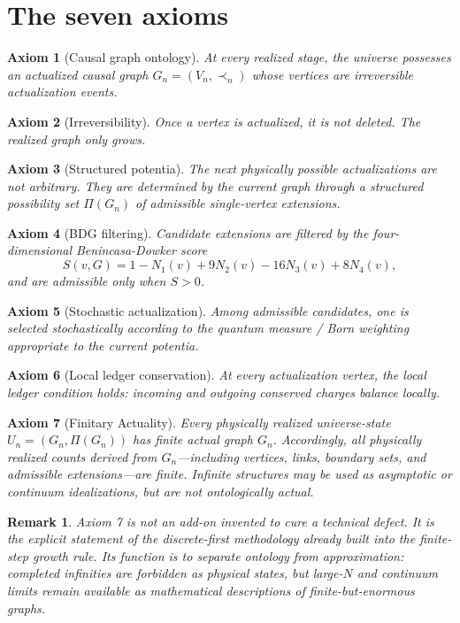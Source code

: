 \documentclass[11pt]{article}
\newtheorem{axiom}{Axiom}
\newtheorem{remark}{Remark}
\newcommand{\Pot}{\Pi}
\begin{document}
\section{The seven axioms}
\begin{axiom}[Causal graph ontology]
At every realized stage, the universe possesses an actualized causal graph $G_n=(V_n,\prec_n)$ whose vertices are irreversible actualization events.
\end{axiom}

\begin{axiom}[Irreversibility]
Once a vertex is actualized, it is not deleted. The realized graph only grows.
\end{axiom}

\begin{axiom}[Structured potentia]
The next physically possible actualizations are not arbitrary. They are determined by the current graph through a structured possibility set $\Pot(G_n)$ of admissible single-vertex extensions.
\end{axiom}

\begin{axiom}[BDG filtering]
Candidate extensions are filtered by the four-dimensional Benincasa-Dowker score
\[
S(v,G)=1-N_1(v)+9N_2(v)-16N_3(v)+8N_4(v),
\]
and are admissible only when $S>0$.
\end{axiom}

\begin{axiom}[Stochastic actualization]
Among admissible candidates, one is selected stochastically according to the quantum measure / Born weighting appropriate to the current potentia.
\end{axiom}

\begin{axiom}[Local ledger conservation]
At every actualization vertex, the local ledger condition holds: incoming and outgoing conserved charges balance locally.
\end{axiom}

\begin{axiom}[Finitary Actuality]
Every physically realized universe-state $U_n=(G_n,\Pot(G_n))$ has finite actual graph $G_n$. Accordingly, all physically realized counts derived from $G_n$---including vertices, links, boundary sets, and admissible extensions---are finite. Infinite structures may be used as asymptotic or continuum idealizations, but are not ontologically actual.
\end{axiom}

\begin{remark}
Axiom 7 is not an add-on invented to cure a technical defect. It is the explicit statement of the discrete-first methodology already built into the finite-step growth rule. Its function is to separate ontology from approximation: completed infinities are forbidden as physical states, but large-$N$ and continuum limits remain available as mathematical descriptions of finite-but-enormous graphs.
\end{remark}
\end{document}
